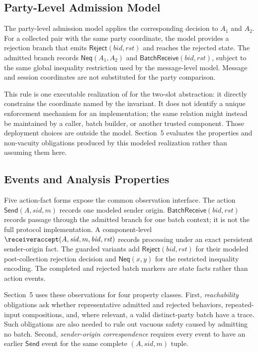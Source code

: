 \subsection{Party-Level Admission Model}

The party-level admission model applies the corresponding decision to
$A_1$ and $A_2$. For a collected pair with the same party coordinate, the
model provides a rejection branch that emits
\(\mathsf{Reject}(\mathit{bid},\mathit{rst})\) and reaches the rejected state.
The admitted branch records \(\mathsf{Neq}(A_1,A_2)\) and
\(\mathsf{BatchReceive}(\mathit{bid},\mathit{rst})\), subject to the same
global inequality restriction used by the message-level model. Message and
session coordinates are not substituted for the party comparison.

This rule is one executable realization of \distinctparty for the two-slot
abstraction: it directly constrains the coordinate named by the invariant.
It does not identify a unique enforcement mechanism for an implementation;
the same relation might instead be maintained by a caller, batch builder, or
another trusted component. Those deployment choices are outside the model.
Section~5 evaluates the properties and non-vacuity obligations produced by
this modeled realization rather than assuming them here.

\subsection{Events and Analysis Properties}

Five action-fact forms expose the common observation interface. The action
\(\mathsf{Send}(A,\mathit{sid},m)\) records one modeled sender origin.
\(\mathsf{BatchReceive}(\mathit{bid},\mathit{rst})\) records passage through
the admitted branch for one batch context; it is not the full protocol
implementation. A component-level
\(\receiveraccept(A,\mathit{sid},m,\mathit{bid},\mathit{rst})\) records
processing under an exact persistent sender-origin fact. The guarded variants
add \(\mathsf{Reject}(\mathit{bid},\mathit{rst})\) for their modeled
post-collection rejection decision and \(\mathsf{Neq}(x,y)\) for the
restricted inequality encoding. The completed and rejected batch markers are
state facts rather than action events.

Section~5 uses these observations for four property classes. First,
\emph{reachability} obligations ask whether representative admitted and
rejected behaviors, repeated-input compositions, and, where relevant, a valid
distinct-party batch have a trace. Such obligations are also needed to rule out
vacuous safety caused by admitting no batch. Second,
\emph{sender-origin correspondence} requires every \receiveraccept event to
have an earlier \(\mathsf{Send}\) event for the same complete
\((A,\mathit{sid},m)\) tuple.

